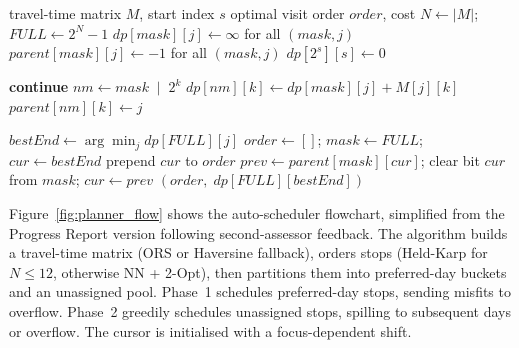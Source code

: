 \begin{algorithm}[H]
  \caption{Held-Karp exact solver - bitmask dynamic programming (DP) in $O(2^N \cdot N^2)$, used for $N \leq 12$.}
  \label{alg:heldkarp}
  \begin{algorithmic}[1]
    \Require travel-time matrix $M$, start index $s$
    \Ensure  optimal visit order $\mathit{order}$, cost
    \State $N \gets |M|$; \; $\mathit{FULL} \gets 2^N - 1$
    \State $\mathit{dp}[\mathit{mask}][j] \gets \infty$ for all $(\mathit{mask}, j)$
    \State $\mathit{parent}[\mathit{mask}][j] \gets -1$ for all $(\mathit{mask}, j)$
    \State $\mathit{dp}[2^s][s] \gets 0$

    \Statex
       \textbf{continue} \EndIf
          \State $\mathit{nm} \gets \mathit{mask} \;\mathbin{|}\; 2^k$
            \State $\mathit{dp}[\mathit{nm}][k] \gets \mathit{dp}[\mathit{mask}][j] + M[j][k]$
            \State $\mathit{parent}[\mathit{nm}][k] \gets j$
          \EndIf
        \EndFor
      \EndFor
    \EndFor

    \Statex {}
    \State $\mathit{bestEnd} \gets \arg\min_j \mathit{dp}[\mathit{FULL}][j]$
    \State $\mathit{order} \gets []$; \; $\mathit{mask} \gets \mathit{FULL}$; \;
           $\mathit{cur} \gets \mathit{bestEnd}$
      \State prepend $\mathit{cur}$ to $\mathit{order}$
      \State $\mathit{prev} \gets \mathit{parent}[\mathit{mask}][\mathit{cur}]$; \;
             clear bit $\mathit{cur}$ from $\mathit{mask}$; \;
             $\mathit{cur} \gets \mathit{prev}$
    \EndWhile
    \State \Return $(\mathit{order},\;\mathit{dp}[\mathit{FULL}][\mathit{bestEnd}])$
  \end{algorithmic}
\end{algorithm}

Figure~\ref{fig:planner_flow} shows the auto-scheduler flowchart, simplified from the Progress Report version following second-assessor feedback. The algorithm builds a travel-time matrix (ORS or Haversine fallback), orders stops (Held-Karp for $N \leq 12$, otherwise NN + 2-Opt), then partitions them into preferred-day buckets and an unassigned pool. Phase~1 schedules preferred-day stops, sending misfits to overflow. Phase~2 greedily schedules unassigned stops, spilling to subsequent days or overflow. The cursor is initialised with a focus-dependent shift.


